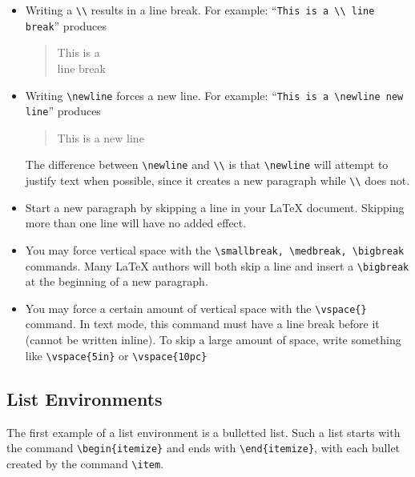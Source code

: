 \documentclass[letterpaper,twoside,10pt]{article}
\begin{document}
\begin{itemize}
\item Writing a \verb!\\! results in a line break. For example: ``\verb!This is a \\ line break!'' produces
\begin{quote}
This is a \\ line break
\end{quote}

\item Writing \verb!\newline! forces a new line. For example: ``\verb!This is a \newline new line!'' produces
\begin{quote}
This is a \newline new line
\end{quote}
The difference between \verb!\newline! and \verb!\\! is that \verb!\newline! will attempt to justify
text when possible, since it creates a new paragraph while \verb!\\! does not.

\item Start a new paragraph by skipping a line in your {\LaTeX} document. Skipping more than one
line will have no added effect.

\item You may force vertical space with the \verb!\smallbreak, \medbreak, \bigbreak! commands. Many
{\LaTeX} authors will both skip a line and insert a \verb!\bigbreak! at the beginning of a new
paragraph.

\item You may force a certain amount of vertical space with the \verb!\vspace{}! command. In text
mode, this command must have a line break before it (cannot be written inline). To skip a large
amount of space, write something like \verb!\vspace{5in}! or \verb!\vspace{10pc}! 
\end{itemize}


\subsection{List Environments}

The first example of a list environment is a bulletted list. Such a list starts with the command
\verb!\begin{itemize}! and ends with \verb!\end{itemize}!, with each bullet created by the command
\verb!\item!.
\end{document}
